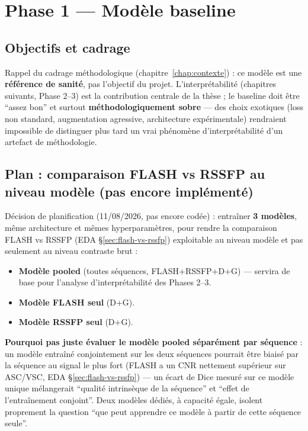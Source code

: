 \chapter{Phase 1 --- Modèle baseline}
\label{chap:phase1}

\section{Objectifs et cadrage}

Rappel du cadrage méthodologique (chapitre~\ref{chap:contexte}) : ce modèle est une
\textbf{référence de sanité}, pas l'objectif du projet. L'interprétabilité
(chapitres suivants, Phase 2--3) est la contribution centrale de la thèse ; le
baseline doit être ``assez bon'' et surtout \textbf{méthodologiquement sobre} --- des
choix exotiques (loss non standard, augmentation agressive, architecture
expérimentale) rendraient impossible de distinguer plus tard un vrai phénomène
d'interprétabilité d'un artefact de méthodologie.

\section{Plan : comparaison FLASH vs RSSFP au niveau modèle (pas encore implémenté)}
\label{sec:phase1-plan-flash-rssfp}

Décision de planification (11/08/2026, pas encore codée) : entraîner \textbf{3 modèles},
même architecture et mêmes hyperparamètres, pour rendre la comparaison FLASH vs RSSFP
(EDA \S\ref{sec:flash-vs-rssfp}) exploitable au niveau modèle et pas seulement au
niveau contraste brut :

\begin{itemize}[nosep]
    \item \textbf{Modèle pooled} (toutes séquences, FLASH+RSSFP+D+G) --- servira de
        base pour l'analyse d'interprétabilité des Phases 2--3.
    \item \textbf{Modèle FLASH seul} (D+G).
    \item \textbf{Modèle RSSFP seul} (D+G).
\end{itemize}

\textbf{Pourquoi pas juste évaluer le modèle pooled séparément par séquence} : un
modèle entraîné conjointement sur les deux séquences pourrait être biaisé par la
séquence au signal le plus fort (FLASH a un CNR nettement supérieur sur ASC/VSC, EDA
\S\ref{sec:flash-vs-rssfp}) --- un écart de Dice mesuré sur ce modèle unique
mélangerait ``qualité intrinsèque de la séquence'' et ``effet de l'entraînement
conjoint''. Deux modèles dédiés, à capacité égale, isolent proprement la question
``que peut apprendre ce modèle à partir de cette séquence seule''.

